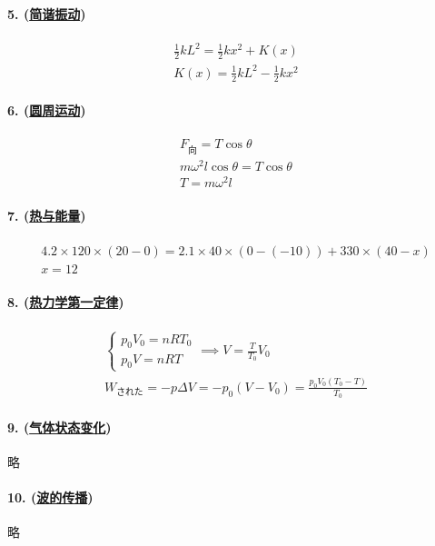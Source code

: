 \paragraph{5. (\hyperref[subsec:简谐振动]{简谐振动})}

\begin{gather*}
    \frac12kL^2=\frac12kx^2+K(x)\\
    K(x)=\frac12kL^2-\frac12kx^2
\end{gather*}

\paragraph{6. (\hyperref[subsec:圆周运动]{圆周运动})}

\begin{gather*}
    F_\textrm{向}=T\cos\theta\\
    m\omega^2l\cos\theta=T\cos\theta\\
    T=m\omega^2l
\end{gather*}

\paragraph{7. (\hyperref[sec:热与能量]{热与能量})}

\begin{gather*}
    4.2\times120\times(20-0)=2.1\times40\times(0-(-10))+330\times(40-x)\\
    x=12
\end{gather*}

\paragraph{8. (\hyperref[subsec:热力学第一定律]{热力学第一定律})}

\begin{gather*}
    \begin{cases}
        p_0V_0=nRT_0\\
        p_0V=nRT
    \end{cases}\implies V=\frac{T}{T_0}V_0\\
    W_\textrm{された}=-p\Delta V=-p_0(V-V_0)=\frac{p_0V_0(T_0-T)}{T_0}
\end{gather*}

\paragraph{9. (\hyperref[subsec:气体状态变化]{气体状态变化})} 略
\paragraph{10. (\hyperref[subsec:波的传播]{波的传播})} 略
